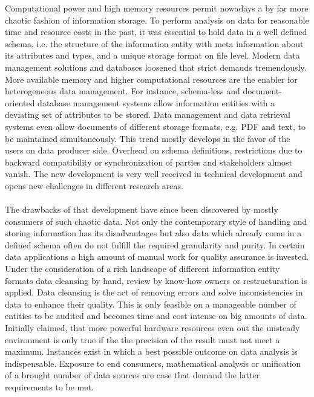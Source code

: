 Computational power and high memory resources permit nowadays a by far more chaotic fashion of information storage. To perform analysis on data for reasonable time and resource costs in the past, it was essential to hold data in a well defined schema, i.e. the structure of the information entity with meta information about its attributes and types, and a unique storage format on file level. Modern data management solutions and databases loosened that strict demands tremendously. More available memory and higher computational resources are the enabler for heterogeneous data management. For instance, schema-less and document-oriented database management systems allow information entities with a deviating set of attributes to be stored.
Data management and data retrieval systems even allow documents of different storage formats, e.g. PDF and text, to be maintained simultaneously. This trend mostly develops in the favor of the users on data producer side. Overhead on schema definitions, restrictions due to backward compatibility or synchronization of parties and stakeholders almost vanish. The new development is very well received in technical development and opens new challenges in different research areas.
\\\\
The drawbacks of that development have since been discovered by mostly consumers of such chaotic data.
Not only the contemporary style of handling and storing information has its disadvantages but also data which already come in a defined schema often do not fulfill the required granularity and purity. In certain data applications a high amount of manual work for quality assurance is invested.
Under the consideration of a rich landscape of different information entity formats data cleansing by hand, review by know-how owners or restructuration is applied. Data cleansing is the act of removing errors and solve inconsistencies in data to enhance their quality. This is only feasible on a manageable number of entities to be audited and becomes time and cost intense on big amounts of data. Initially claimed, that more powerful hardware resources even out the unsteady environment is only true if the the precision of the result must not meet a maximum. Instances exist in which a best possible outcome on data analysis is indispensable. Exposure to end consumers, mathematical analysis or unification of a brought number of data sources are case that demand the latter requirements to be met. 

